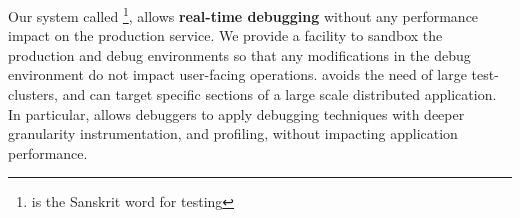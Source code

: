 



Our system called \parikshan\footnote{\parikshan is the Sanskrit word for  testing}, allows \textbf{real-time debugging} without any performance impact on the production service. 
We provide a facility to sandbox the production and debug environments so that any modifications in the debug environment do not impact user-facing operations.
\parikshan avoids the need of large test-clusters, and can target specific sections of a large scale distributed application.
In particular, \parikshan allows debuggers to apply debugging techniques with deeper granularity instrumentation, and profiling, without impacting application performance.

